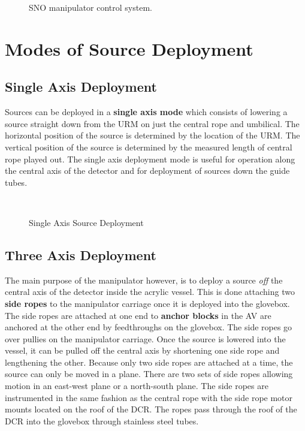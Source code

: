 \begin{figure}[htbp]
\begin{center}
\leavevmode
\epsfxsize=6in
\caption[SNO manipulator control system]
  {SNO manipulator control system.
  }
\end{center}
\end{figure}


  



\section{Modes of Source Deployment}

\subsection{Single Axis Deployment}
  
  Sources can be deployed in a {\bf single axis mode} which consists of
lowering a source straight down from the URM on just the central rope
and umbilical.  The horizontal position of the source is determined
by the location of the URM.  The vertical position of the source is
determined by the measured length of central rope played out.  The single
axis deployment mode is useful for operation along the central axis of
the detector and for deployment of sources down the guide tubes.
  
\begin{figure}[htb]
\begin{center}
\leavevmode
\epsfxsize=5in
~\\
\caption[Single Axis Source Deployment]
        {Single Axis Source Deployment
        }
\end{center}
\end{figure} 
  
  
\subsection{Three Axis Deployment}
  The main purpose of the manipulator however, is to deploy a source
{\em off} the central axis of the detector inside the acrylic vessel.
This is done attaching two {\bf side ropes} to the manipulator carriage
once it is deployed into the glovebox.  The side ropes are attached at 
one end to {\bf anchor blocks} in the AV are anchored at the other end
by feedthroughs on the glovebox.  The side ropes go over pullies on 
the manipulator carriage.  Once the source is lowered into the vessel, it
can be pulled off the central axis by shortening one side rope and lengthening
the other.  Because only two side ropes are attached at a time, the source
can only be moved in a plane.  There are two sets of side ropes allowing
motion in an east-west plane or a north-south plane.  The side ropes
are instrumented in the same fashion as the central rope with the 
side rope motor mounts located on the roof of the DCR.  The ropes pass
through the roof of the DCR into the glovebox through stainless steel tubes.
  
